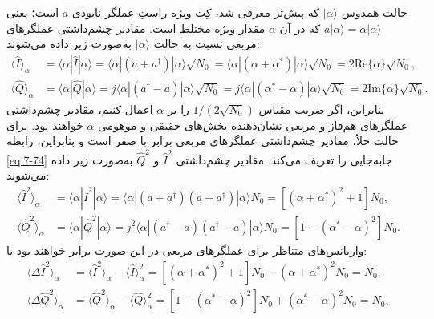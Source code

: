 حالت همدوس $| \alpha \rangle$ که پیش‌تر معرفی شد، کِت ویژه راستِ عملگر نابودی $a$ است؛ یعنی $a|\alpha\rangle = \alpha|\alpha\rangle$ که در آن $\alpha$ مقدار ویژه مختلط است. مقادیر چشم‌داشتی عملگرهای مربعی نسبت به حالت $|\alpha\rangle$ به‌صورت زیر داده می‌شوند:
\begin{equation}
	\begin{aligned}
		\langle \hat{I} \rangle_\alpha &= \langle \alpha | \hat{I} | \alpha \rangle = \langle \alpha | (a + a^\dagger) | \alpha \rangle \sqrt{N_0} = \langle \alpha | (\alpha + \alpha^*) | \alpha \rangle \sqrt{N_0} = 2\text{Re}\{\alpha\}\sqrt{N_0}, \\
		\langle \hat{Q} \rangle_\alpha &= \langle \alpha | \hat{Q} | \alpha \rangle = j\langle \alpha | (a^\dagger - a) | \alpha \rangle \sqrt{N_0} = j\langle \alpha | (\alpha^* - \alpha) | \alpha \rangle \sqrt{N_0} = 2\text{Im}\{\alpha\}\sqrt{N_0}.
	\end{aligned}
	\label{eq:7-74}
\end{equation}
بنابراین، اگر ضریب مقیاس $1/(2\sqrt{N_0})$ را بر $\alpha$ اعمال کنیم، مقادیر چشم‌داشتی عملگرهای هم‌فاز و مربعی نشان‌دهنده بخش‌های حقیقی و موهومی $\alpha$ خواهند بود. برای حالت خلأ، مقادیر چشم‌داشتی عملگرهای مربعی برابر با صفر است و بنابراین، رابطه \eqref{eq:7-74} جابه‌جایی را تعریف می‌کند. مقادیر چشم‌داشتی $\hat{I}^2$ و $\hat{Q}^2$ به‌صورت زیر داده می‌شوند:
\begin{equation}
	\begin{aligned}
		\langle \hat{I}^2 \rangle_\alpha &= \langle \alpha | \hat{I}^2 | \alpha \rangle = \langle \alpha | (a + a^\dagger)(a + a^\dagger) | \alpha \rangle N_0 = [(\alpha + \alpha^*)^2 + 1] N_0, \\
		\langle \hat{Q}^2 \rangle_\alpha &= \langle \alpha | \hat{Q}^2 | \alpha \rangle = j^2 \langle \alpha | (a^\dagger - a)(a^\dagger - a) | \alpha \rangle N_0 = [1 - (\alpha^* - \alpha)^2] N_0.
	\end{aligned}
	\label{eq:7-75}
\end{equation}
واریانس‌های متناظر برای عملگرهای مربعی در این صورت برابر خواهند بود با:
\begin{equation}
	\begin{aligned}
		\langle \Delta \hat{I}^2 \rangle_\alpha &= \langle \hat{I}^2 \rangle_\alpha - \langle \hat{I} \rangle_\alpha^2 = [(\alpha + \alpha^*)^2 + 1] N_0 - (\alpha + \alpha^*)^2 N_0 = N_0, \\
		\langle \Delta \hat{Q}^2 \rangle_\alpha &= \langle \hat{Q}^2 \rangle_\alpha - \langle \hat{Q} \rangle_\alpha^2 = [1 - (\alpha^* - \alpha)^2] N_0 + (\alpha^* - \alpha)^2 N_0 = N_0,
	\end{aligned}
	\label{eq:7-76}
\end{equation}
